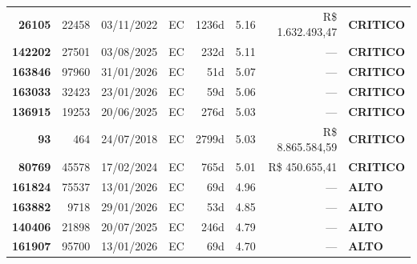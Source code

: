 \documentclass[a4paper,10pt]{article}
\begin{document}
\begin{center}
\begin{longtable}{>{\scriptsize}r>{\scriptsize}r>{\scriptsize}c>{\scriptsize}c>{\scriptsize}r>{\scriptsize}r>{\scriptsize}r>{\scriptsize}l}
\textcolor{anomred}{\textbf{26105}} & 22458 & 03/11/2022 & \textcolor{anomorange}{EC} & 1236d & \textcolor{anomred}{5.16} & R\$ 1.632.493,47 & \textcolor{anomred}{\textbf{CRITICO}} \\

\textcolor{anomred}{\textbf{142202}} & 27501 & 03/08/2025 & \textcolor{anomorange}{EC} & 232d & \textcolor{anomred}{5.11} & --- & \textcolor{anomred}{\textbf{CRITICO}} \\

\textcolor{anomred}{\textbf{163846}} & 97960 & 31/01/2026 & \textcolor{anomorange}{EC} & 51d & \textcolor{anomred}{5.07} & --- & \textcolor{anomred}{\textbf{CRITICO}} \\

\textcolor{anomred}{\textbf{163033}} & 32423 & 23/01/2026 & \textcolor{anomorange}{EC} & 59d & \textcolor{anomred}{5.06} & --- & \textcolor{anomred}{\textbf{CRITICO}} \\

\textcolor{anomred}{\textbf{136915}} & 19253 & 20/06/2025 & \textcolor{anomorange}{EC} & 276d & \textcolor{anomred}{5.03} & --- & \textcolor{anomred}{\textbf{CRITICO}} \\

\textcolor{anomred}{\textbf{93}} & 464 & 24/07/2018 & \textcolor{anomorange}{EC} & 2799d & \textcolor{anomred}{5.03} & R\$ 8.865.584,59 & \textcolor{anomred}{\textbf{CRITICO}} \\

\textcolor{anomred}{\textbf{80769}} & 45578 & 17/02/2024 & \textcolor{anomorange}{EC} & 765d & \textcolor{anomred}{5.01} & R\$ 450.655,41 & \textcolor{anomred}{\textbf{CRITICO}} \\

\textcolor{anomorange}{\textbf{161824}} & 75537 & 13/01/2026 & \textcolor{anomorange}{EC} & 69d & \textcolor{anomorange}{4.96} & --- & \textcolor{anomorange}{\textbf{ALTO}} \\

\textcolor{anomorange}{\textbf{163882}} & 9718 & 29/01/2026 & \textcolor{anomorange}{EC} & 53d & \textcolor{anomorange}{4.85} & --- & \textcolor{anomorange}{\textbf{ALTO}} \\

\textcolor{anomorange}{\textbf{140406}} & 21898 & 20/07/2025 & \textcolor{anomorange}{EC} & 246d & \textcolor{anomorange}{4.79} & --- & \textcolor{anomorange}{\textbf{ALTO}} \\

\textcolor{anomorange}{\textbf{161907}} & 95700 & 13/01/2026 & \textcolor{anomorange}{EC} & 69d & \textcolor{anomorange}{4.70} & --- & \textcolor{anomorange}{\textbf{ALTO}} \\


\end{longtable}
\end{center}
\end{document}
